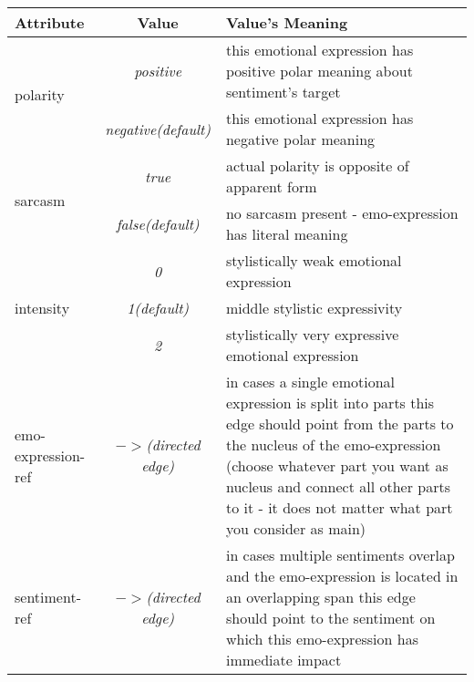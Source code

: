 \documentclass[11pt,a4paper]{article}
\begin{document}
\begin{tabular}{|l|c|p{}|}\hline
  Attribute & Value & Value's Meaning\\\hline

  \multirow{2}{*}{polarity} & \textit{positive} & this emotional
  expression has positive polar meaning about sentiment's
  target\\\cline{2-3}

  & \textit{negative\newline(default)} & this emotional expression has
  negative polar meaning\\\hline


  \multirow{2}{*}{sarcasm} & \textit{true} & actual polarity is
  opposite of apparent form \\\cline{2-3}

  & \textit{false\newline(default)} & no sarcasm present - 
  emo-expression has literal meaning\\\hline
  

  \multirow{3}{*}{intensity} & \textit{0} & stylistically weak
  emotional expression\\\cline{2-3}

  & \textit{1\newline(default)} & middle stylistic
  expressivity\\\cline{2-3}

  & \textit{2} & stylistically very expressive emotional
  expression\\\hline


  emo-expression-ref & \textit{$->$\newline(directed edge)} & in cases
  a single emotional expression is split into parts this edge
  should point from the parts to the nucleus of the emo-expression (choose
  whatever part you want as nucleus and connect all other parts to it
  - it does not matter what part you consider as main)\\\hline


  sentiment-ref & \textit{$->$\newline(directed edge)} & in cases
  multiple sentiments overlap and the emo-expression is located in an overlapping span this edge
  should point to the sentiment on which this emo-expression has immediate
  impact\\\hline
\end{tabular}
\vspace{0.5cm}
\end{document}
